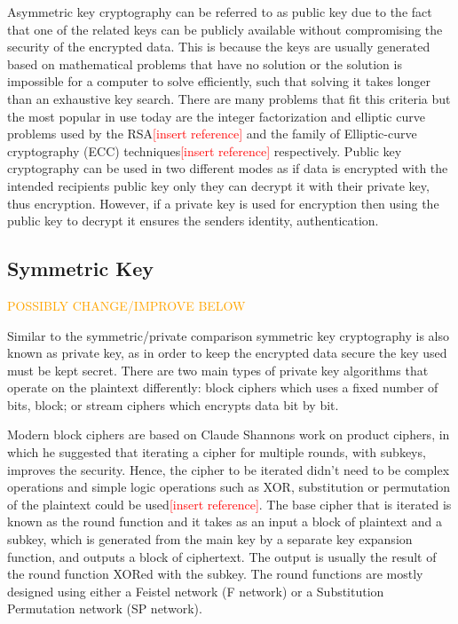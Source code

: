 \documentclass[12pt,twoside,a4paper]{report}
\begin{document}
	Asymmetric key cryptography can be referred to as public key due to the fact that one of the related keys can be publicly available without compromising the security of the encrypted data. This is because the keys are usually generated based on mathematical problems that have no solution or the solution is impossible for a computer to solve efficiently, such that solving it takes longer than an exhaustive key search\cite{BruceSchneier2000}. There are many problems that fit this criteria but the most popular in use today are the integer factorization and elliptic curve problems used by the RSA\textcolor{red}{[insert reference]} and the family of Elliptic-curve cryptography (ECC) techniques\textcolor{red}{[insert reference]} respectively. Public key cryptography can be used in two different modes as if data is encrypted with the intended recipients public key only they can decrypt it with their private key, thus encryption. However, if a private key is used for encryption then using the public key to decrypt it ensures the senders identity, authentication\cite{AlfredJ.Menezes1996}.
    
	\subsection{Symmetric Key}
	\textcolor{orange}{POSSIBLY CHANGE/IMPROVE BELOW}
    
	Similar to the symmetric/private comparison symmetric key cryptography is also known as private key, as in order to keep the encrypted data secure the key used must be kept secret. There are two main types of private key algorithms that operate on the plaintext differently: block ciphers which uses a fixed number of bits, block; or stream ciphers which encrypts data bit by bit\cite{AlfredJ.Menezes1996}.
    
	Modern block ciphers are based on Claude Shannons work on product ciphers\cite{Shannon1949}, in which he suggested that iterating a cipher for multiple rounds, with subkeys, improves the security. Hence, the cipher to be iterated didn't need to be complex operations and simple logic operations such as XOR, substitution or permutation of the plaintext could be used\textcolor{red}{[insert reference]}. The base cipher that is iterated is known as the round function and it takes as an input a block of plaintext and a subkey, which is generated from the main key by a separate key expansion function, and outputs a block of ciphertext. The output is usually the result of the round function XORed with the subkey. The round functions are mostly designed using either a Feistel network\cite{Feistel1973} (F network) or a Substitution Permutation network (SP network)\cite{AlfredJ.Menezes1996}.
    
\end{document}
